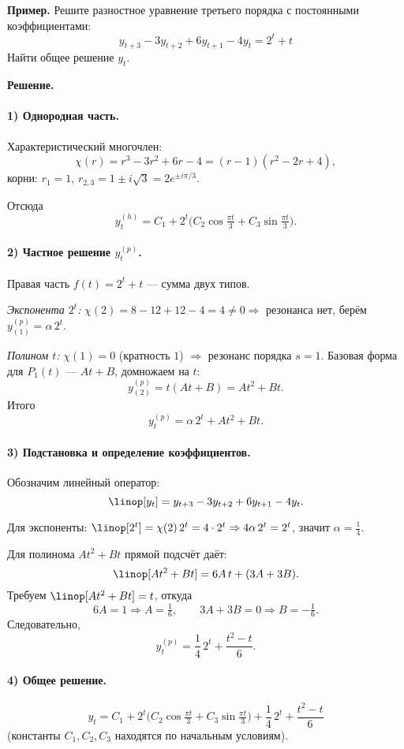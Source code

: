 \bigskip

\textbf{Пример.} Решите разностное уравнение третьего порядка с постоянными коэффициентами:
\[
y_{t+3} - 3y_{t+2} + 6y_{t+1} - 4y_t = 2^t + t
\]
Найти общее решение $y_t$.

\bigskip

\textbf{Решение.}

\paragraph{1) Однородная часть.}
Характеристический многочлен:
\[
\chi(r)=r^3-3r^2+6r-4=(r-1)(r^2-2r+4),
\]
корни: $r_1=1$, $r_{2,3}=1\pm i\sqrt{3}=2e^{\pm i\pi/3}$.

Отсюда
\[
y_t^{(h)} = C_1 + 2^t\Big(C_2\cos\tfrac{\pi t}{3} + C_3\sin\tfrac{\pi t}{3}\Big).
\]

\paragraph{2) Частное решение $y_t^{(p)}$.}
Правая часть $f(t) = 2^t + t$ — сумма двух типов.

\textit{Экспонента $2^t$:} $\chi(2) = 8 - 12 + 12 - 4 = 4 \neq 0 \Rightarrow$ резонанса нет, берём $y^{(p)}_{(1)} = \alpha\,2^t$.

\textit{Полином $t$:} $\chi(1) = 0$ (кратность $1$) $\Rightarrow$ резонанс порядка $s=1$. Базовая форма для $P_1(t)$ — $At+B$, домножаем на $t$:
\[
y^{(p)}_{(2)} = t(At+B) = At^2 + Bt.
\]
Итого
\[
y_t^{(p)} = \alpha\,2^t + At^2 + Bt.
\]

\paragraph{3) Подстановка и определение коэффициентов.}
Обозначим линейный оператор:
\[
\linop[y_t] = y_{t+3} - 3y_{t+2} + 6y_{t+1} - 4y_t.
\]

Для экспоненты: $\linop[2^t] = \chi(2)\,2^t = 4\cdot2^t \Rightarrow 4\alpha\,2^t = 2^t$, значит $\alpha = \tfrac{1}{4}$.

Для полинома $At^2 + Bt$ прямой подсчёт даёт:
\[
\linop[At^2 + Bt] = 6A\,t + (3A + 3B).
\]
Требуем $\linop[At^2 + Bt] = t$, откуда
\[
6A = 1 \Rightarrow A = \tfrac{1}{6}, \qquad 3A + 3B = 0 \Rightarrow B = -\tfrac{1}{6}.
\]
Следовательно,
\[
y_t^{(p)} = \frac{1}{4}\,2^t + \frac{t^2 - t}{6}.
\]

\paragraph{4) Общее решение.}
\[
\boxed{
y_t = C_1 + 2^t\Big(C_2\cos\tfrac{\pi t}{3} + C_3\sin\tfrac{\pi t}{3}\Big)
+ \frac{1}{4}\,2^t + \frac{t^2 - t}{6}
}
\]
(константы $C_1, C_2, C_3$ находятся по начальным условиям).
